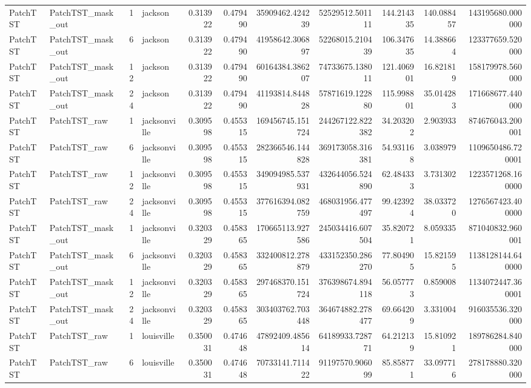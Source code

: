 \begin{longtable}{llrlrrrrrrr}
PatchTST & PatchTST\_mask\_out & 1 & jackson & 0.313922 & 0.479490 & 35909462.424239 & 52529512.501111 & 144.214335 & 140.088457 & 143195680.000000 \\
PatchTST & PatchTST\_mask\_out & 6 & jackson & 0.313922 & 0.479490 & 41958642.306897 & 52268015.210439 & 106.347635 & 14.388664 & 123377659.520000 \\
PatchTST & PatchTST\_mask\_out & 12 & jackson & 0.313922 & 0.479490 & 60164384.386207 & 74733675.138011 & 121.406901 & 16.821819 & 158179978.560000 \\
PatchTST & PatchTST\_mask\_out & 24 & jackson & 0.313922 & 0.479490 & 41193814.844828 & 57871619.122880 & 115.998801 & 35.014283 & 171668677.440000 \\
PatchTST & PatchTST\_raw & 1 & jacksonville & 0.309598 & 0.455315 & 169456745.151724 & 244267122.822382 & 34.203202 & 2.903933 & 874676043.200001 \\
PatchTST & PatchTST\_raw & 6 & jacksonville & 0.309598 & 0.455315 & 282366546.144828 & 369173058.316381 & 54.931168 & 3.038979 & 1109650486.720001 \\
PatchTST & PatchTST\_raw & 12 & jacksonville & 0.309598 & 0.455315 & 349094985.537931 & 432644056.524890 & 62.484333 & 3.731302 & 1223571268.160000 \\
PatchTST & PatchTST\_raw & 24 & jacksonville & 0.309598 & 0.455315 & 377616394.082759 & 468031956.477497 & 99.423924 & 38.033720 & 1276567423.400000 \\
PatchTST & PatchTST\_mask\_out & 1 & jacksonville & 0.320329 & 0.458365 & 170665113.927586 & 245034416.607504 & 35.820721 & 8.059335 & 871040832.960001 \\
PatchTST & PatchTST\_mask\_out & 6 & jacksonville & 0.320329 & 0.458365 & 332400812.278879 & 433152350.286270 & 77.804905 & 15.821595 & 1138128144.640000 \\
PatchTST & PatchTST\_mask\_out & 12 & jacksonville & 0.320329 & 0.458365 & 297468370.151724 & 376398674.894118 & 56.057773 & 0.859008 & 1134072447.360001 \\
PatchTST & PatchTST\_mask\_out & 24 & jacksonville & 0.320329 & 0.458365 & 303403762.703448 & 364674882.278477 & 69.664209 & 3.331004 & 916035536.320000 \\
PatchTST & PatchTST\_raw & 1 & louisville & 0.350031 & 0.474648 & 47892409.485614 & 64189933.728771 & 64.212139 & 15.810921 & 189786284.840000 \\
PatchTST & PatchTST\_raw & 6 & louisville & 0.350031 & 0.474648 & 70733141.711422 & 91197570.906099 & 85.858771 & 33.097716 & 278178880.320000 \\

\end{longtable}
